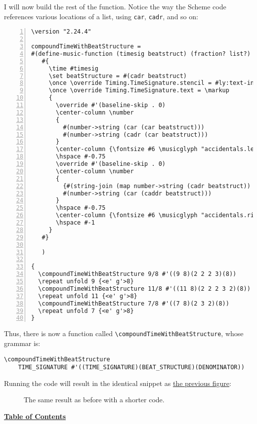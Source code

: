 I will now build the rest of the function. Notice the way the Scheme code references various locations of a list, using \verb|car|, \verb|cadr|, and so on:

\begin{Verbatim}[numbers=left,xleftmargin=5mm]
\version "2.24.4"

compoundTimeWithBeatStructure =
#(define-music-function (timesig beatstruct) (fraction? list?)
   #{
     \time #timesig
     \set beatStructure = #(cadr beatstruct)
     \once \override Timing.TimeSignature.stencil = #ly:text-interface::print
     \once \override Timing.TimeSignature.text = \markup
     {
       \override #'(baseline-skip . 0)
       \center-column \number
       {
         #(number->string (car (car beatstruct)))
         #(number->string (cadr (car beatstruct)))
       }
       \center-column {\fontsize #6 \musicglyph "accidentals.leftparen"}
       \hspace #-0.75
       \override #'(baseline-skip . 0)
       \center-column \number
       {
         {#(string-join (map number->string (cadr beatstruct)) "+")}
         #(number->string (car (caddr beatstruct)))
       }
       \hspace #-0.75
       \center-column {\fontsize #6 \musicglyph "accidentals.rightparen"}
       \hspace #-1
     }
   #}

   )

{
  \compoundTimeWithBeatStructure 9/8 #'((9 8)(2 2 2 3)(8))
  \repeat unfold 9 {<e' g'>8}
  \compoundTimeWithBeatStructure 11/8 #'((11 8)(2 2 2 3 2)(8))
  \repeat unfold 11 {<e' g'>8}
  \compoundTimeWithBeatStructure 7/8 #'((7 8)(2 3 2)(8))
  \repeat unfold 7 {<e' g'>8}
}
\end{Verbatim}

Thus, there is now a function called \verb|\compoundTimeWithBeatStructure|, whose grammar is:

\begin{Verbatim}
\compoundTimeWithBeatStructure 
	TIME_SIGNATURE #'((TIME_SIGNATURE)(BEAT_STRUCTURE)(DENOMINATOR))
\end{Verbatim}

Running the code will result in the identical snippet as \hyperref[fig:figure6]{the previous figure}:


	\begin{figure}[!htb]
	\centering
{}
\label{sec:schemeExample1}
	\caption{\label{fig:figure7} The same result as before with a shorter code.}
	\end{figure}
	


\hfill \break
 

\hyperref[sec:toc]{\textbf{Table of Contents}}

\vfill \break

